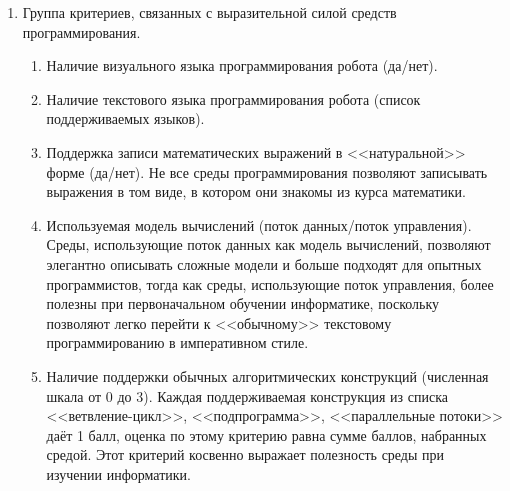 \documentclass[a5paper]{article}
\begin{document}
\begin{enumerate}
    \item Группа критериев, связанных с выразительной силой средств программирования.
    \begin{enumerate}
        \item Наличие визуального языка программирования робота (да/нет).
        \item Наличие текстового языка программирования робота (список поддерживаемых языков).
        \item Поддержка записи математических выражений в <<натуральной>> форме (да/нет). Не все среды 
                программирования позволяют записывать выражения в том виде, в котором они знакомы из курса математики.
        \item Используемая модель вычислений (поток данных/поток управления). Среды, использующие поток 
                данных как модель вычислений, позволяют элегантно описывать сложные модели и больше подходят 
                для опытных программистов, тогда как среды, использующие поток управления, более полезны при 
                первоначальном обучении информатике, поскольку позволяют легко перейти к <<обычному>> текстовому 
                программированию в императивном стиле.
        \item Наличие поддержки обычных алгоритмических конструкций (численная шкала от 0 до 3). Каждая 
                поддерживаемая конструкция из списка <<ветвление-цикл>>, <<подпрограмма>>, <<параллельные потоки>> 
                даёт 1 балл, оценка по этому критерию равна сумме баллов, набранных средой. Этот критерий 
                косвенно выражает полезность среды при изучении информатики.
    

\end{enumerate}
\end{enumerate}
\end{document}
